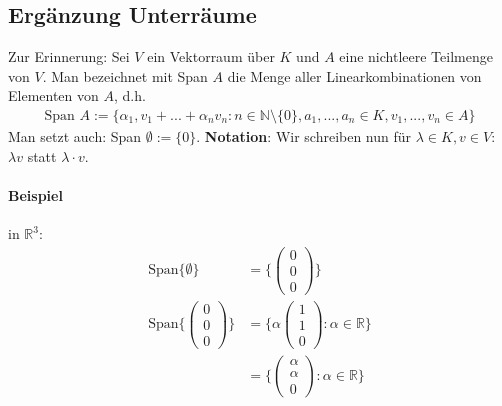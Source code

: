 \documentclass[11pt]{report}
\newcommand*\Zb[1] {\mathbb{#1}}
\newcommand*\f[1] {\textbf{#1}}
\begin{document}
\subsection{Ergänzung Unterräume}
Zur Erinnerung: Sei $V$ ein Vektorraum über $K$ und $A$ eine nichtleere Teilmenge von $V$. Man bezeichnet mit Span $A$ die Menge aller Linearkombinationen von Elementen von $A$, d.h.
\begin{align}
 \text{Span } A := \{\alpha_1, v_1 + ... + \alpha_n v_n: n \in \Zb{N}\setminus\{0\}, a_1, ..., a_n \in K, v_1, ..., v_n \in A\}
\end{align}
Man setzt auch: Span $\emptyset := \{0\}$.
\f{Notation}: Wir schreiben nun für $\lambda \in K, v \in V$: $\lambda v$ statt $\lambda \cdot v$.

\paragraph{Beispiel} in $\Zb{R}^3$:
\begin{align}
 \text{Span} \{\emptyset\} &= \{\begin{pmatrix} 0 \\ 0 \\ 0 \end{pmatrix}\} \\
 \text{Span} \{\begin{pmatrix} 0 \\ 0 \\ 0 \end{pmatrix}\} &= \{\alpha \begin{pmatrix} 1 \\ 1 \\ 0 \end{pmatrix}: \alpha \in \Zb{R} \} \\
&= \{ \begin{pmatrix} \alpha \\ \alpha \\ 0 \end{pmatrix}: \alpha \in \Zb{R} \} 
\end{align}
\end{document}
